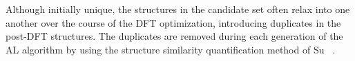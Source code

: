 %
%
Although initially unique, the structures in the candidate set often relax into one another over the course of the DFT optimization, introducing duplicates in the post-DFT structures.
%
The duplicates are removed during each generation of the AL algorithm
by using the structure similarity quantification method of Su ~\cite{Su2017}.
%
